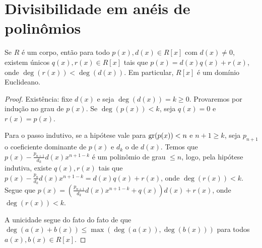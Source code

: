 \section{Divisibilidade em anéis de polinômios}
\begin{prop}
Se $R$ é um corpo, então para todo $p(x), d(x) \in R[x]$ com $d(x)\neq 0$, existem únicos $q(x), r(x) \in R[x]$ tais que $p(x)=d(x)q(x)+r(x)$, onde $\deg(r(x))<\deg(d(x))$.
Em particular, $R[x]$ é um domínio Euclideano.
\end{prop}
\begin{proof}
    Existência: fixe $d(x)$ e seja $\deg(d(x))=k\geq 0$.
    Provaremos por indução no grau de $p(x)$.
    Se $\deg(p(x))<k$, seja $q(x)=0$ e $r(x)=p(x)$.

    Para o passo indutivo, se a hipótese vale para $\operatorname{gr}(p(x))<n$ e $n+1\geq k$, seja $p_{n+1}$ o coeficiente dominante de $p(x)$ e $d_k$ o de $d(x)$.
    Temos que $p(x)-\frac{p_{n+1}}{d_k}d(x)x^{n+1-k}$ é um polinômio de grau $\leq n$, logo, pela hipótese indutiva, existe $q(x), r(x)$ tais que $p(x)-\frac{p_n}{d_k}d(x)x^{n+1-k}=d(x)q(x)+r(x)$, onde $\deg(r(x))<k$.
    Segue que $p(x)=(\frac{p_{n+1}}{d_k}d(x)x^{n+1-k}+q(x))d(x)+r(x)$, onde $\deg(r(x))<k$.

    A unicidade segue do fato do fato de que $\deg(a(x)+b(x))\leq\max(\deg(a(x)), \deg(b(x)))$ para todos $a(x), b(x)\in R[x]$.
\end{proof}